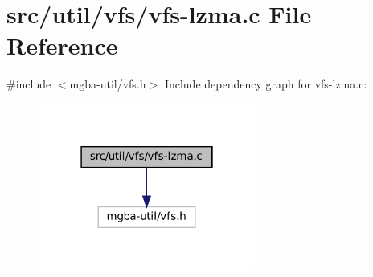 \hypertarget{vfs-lzma_8c}{}\section{src/util/vfs/vfs-\/lzma.c File Reference}
\label{vfs-lzma_8c}
{\ttfamily \#include $<$mgba-\/util/vfs.\+h$>$}\newline
Include dependency graph for vfs-\/lzma.c\+:
\nopagebreak
\begin{figure}[H]
\begin{center}
\leavevmode
\includegraphics[width=202pt]{vfs-lzma_8c__incl}
\end{center}
\end{figure}
